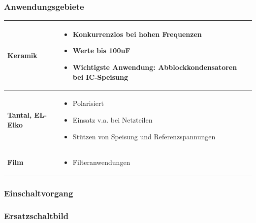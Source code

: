 \subsubsection{Anwendungsgebiete}
\begin{longtable}{|l|l|}
\hline
\begin{minipage}{4cm}
\textbf{Keramik}
\end{minipage}
&
\begin{minipage}{6cm}
\begin{itemize}
  \item Konkurrenzlos bei hohen Frequenzen
  \item Werte bis 100uF
  \item Wichtigste Anwendung: Abblockkondensatoren bei IC-Speisung
\end{itemize}
\end{minipage}
\\
\hline
\begin{minipage}{4cm}
\textbf{Tantal, EL-Elko}
\end{minipage}
&
\begin{minipage}{6cm}
\begin{itemize}
  \item Polarisiert
  \item Einsatz v.a. bei Netzteilen
  \item Stützen von Speisung und Referenzspannungen
\end{itemize}
\end{minipage}
\\
\hline
\begin{minipage}{4cm}
\textbf{Film}
\end{minipage}
&
\begin{minipage}{6cm}
\begin{itemize}
  \item Filteranwendungen
\end{itemize}
\end{minipage}
\\
\hline
\end{longtable}
\subsubsection{Einschaltvorgang}

\subsubsection{Ersatzschaltbild}


